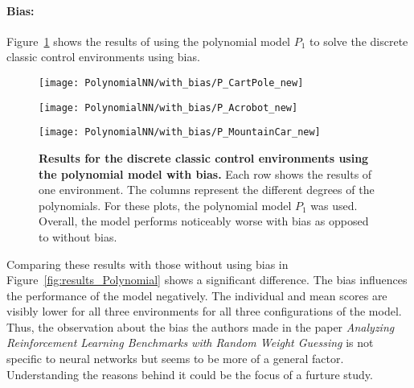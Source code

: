 \paragraph*{Bias:} Figure~\ref{fig:results_Polynomial_bias} shows the results of using the polynomial model $P_1$ to solve the discrete classic control environments using bias.
\begin{figure}[!ht]
  \centering
  \texttt{[image: PolynomialNN/with\_bias/P\_CartPole\_new]}

      \vspace{0.2cm}

  \texttt{[image: PolynomialNN/with\_bias/P\_Acrobot\_new]}

      \vspace{0.2cm}

  \texttt{[image: PolynomialNN/with\_bias/P\_MountainCar\_new]}
\caption[Results for the discrete classic control environments using the polynomial model with bias]{
  \textbf{Results for the discrete classic control environments using the polynomial model with bias.}
   Each row shows the results of one environment. The columns represent the different degrees of the polynomials. For these plots, the polynomial model $P_1$ was used. Overall, the model performs noticeably worse with bias as opposed to without bias.
}
\label{fig:results_Polynomial_bias}
\end{figure}
Comparing these results with those without using bias in Figure~\ref{fig:results_Polynomial} shows a significant difference. The bias influences the performance of the model negatively. The individual and mean scores are visibly lower for all three environments for all three configurations of the model. Thus, the observation about the bias the authors made in the paper \emph{Analyzing Reinforcement Learning Benchmarks with Random Weight Guessing} is not specific to neural networks but seems to be more of a general factor. Understanding the reasons behind it could be the focus of a furture study.

